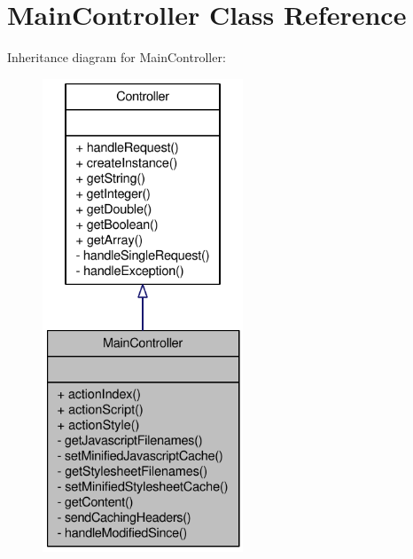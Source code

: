 \hypertarget{classMainController}{
\section{MainController Class Reference}
\label{classMainController}
}


Inheritance diagram for MainController:\nopagebreak
\begin{figure}[H]
\begin{center}
\leavevmode
\includegraphics[height=400pt]{classMainController__inherit__graph}
\end{center}
\end{figure}


